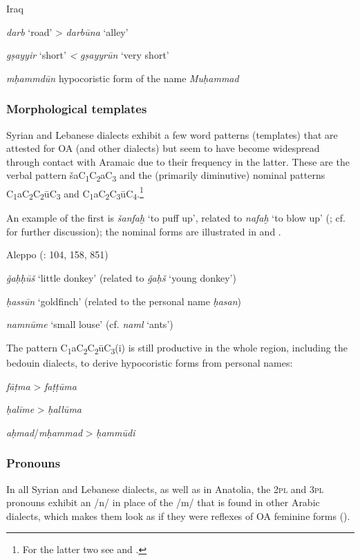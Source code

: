 \documentclass[output=paper]{langsci/langscibook}
\begin{document}
\ea\label{una}
Iraq \citep[72]{Masliyah1997}

\textit{darb} ‘road’ > \textit{darbūna} ‘alley’

\textit{gṣayyir} ‘short’ \textit{<} \textit{gṣayyrūn} ‘very short’

\textit{mḥammdūn} hypocoristic form of the name \textit{Muḥammad}
\z

\subsubsection{Morphological templates}
Syrian and Lebanese dialects exhibit a few word patterns (templates) that are attested for OA (and other dialects) but seem to have become widespread through contact with Aramaic due to their frequency in the latter. These are the verbal pattern šaC\textsubscript{1}C\textsubscript{2}aC\textsubscript{3} and the (primarily diminutive) nominal patterns C\textsubscript{1}aC\textsubscript{2}C\textsubscript{2}ūC\textsubscript{3} and C\textsubscript{1}aC\textsubscript{2}C\textsubscript{3}ūC\textsubscript{4}.\footnote{For the latter two see \citet{Corriente1969} and \citet{Procházka2004}.}\textsubscript{} 

An example of the first is \textit{šanfaḫ} ‘to puff up’, related to \textit{nafaḫ} ‘to blow up’ (\citealt[83]{Féghali1918}; cf. \citealt[201]{Lentin2018} for further discussion); the nominal forms are illustrated in  and .

\ea\label{donkey}
Aleppo (\citealt{Barthélemy1935}: 104, 158, 851) 

\textit{ǧaḥḥūš} ‘little donkey’ (related to \textit{ǧaḥš} `young donkey')

\textit{ḥassūn} ‘goldfinch’ (related to the personal name \textit{ḥasan})

\textit{namnūme} ‘small louse’ (cf. \textit{naml} `ants')
\z

The pattern C\textsubscript{1}aC\textsubscript{2}C\textsubscript{2}ūC\textsubscript{3}(i)\textsubscript{} is still productive in the whole region, including the bedouin dialects, to derive hypocoristic forms from personal names:

\ea\label{fatima}
\textit{fāṭma} > \textit{faṭṭūma}

\textit{ḥalīme} > \textit{ḥallūma}

\textit{aḥmad}/\textit{mḥammad} > \textit{ḥammūdi} 
\z

\subsubsection{Pronouns}
In all Syrian and Lebanese dialects, as well as in Anatolia, the \textsc{2pl} and \textsc{3pl} pronouns exhibit an /n/ in place of the /m/ that is found in other Arabic dialects, which makes them look as if they were reflexes of OA feminine forms (). 
\end{document}
